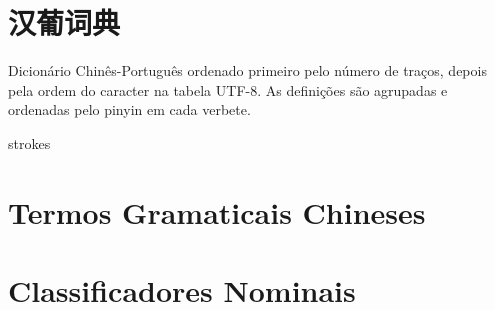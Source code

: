 \documentclass[a4paper,9pt,twoside,openright,book]{memoir}
\begin{document}



\clearpage
\pagestyle{empty}
\tableofcontents

\clearpage
\pagestyle{empty}
\chapter{汉葡词典}

%
%

Dicionário Chinês-Português ordenado primeiro pelo número de traços,
depois pela ordem do caracter na tabela UTF-8.  As definições são
agrupadas e ordenadas pelo pinyin em cada verbete.

\clearpage
\begin{DictionaryEntries}{strokes}
 
 
 
 
 
 
 
 
 
 
 
 
 
 
 
 
 
 
 
 
 
 
%
%
%
%
%
%
%
%
%
\end{DictionaryEntries}

\ifdraftdoc 
\else

\clearpage
\chapter{Termos Gramaticais Chineses}


\clearpage
\chapter{Classificadores Nominais}

\end{document}
